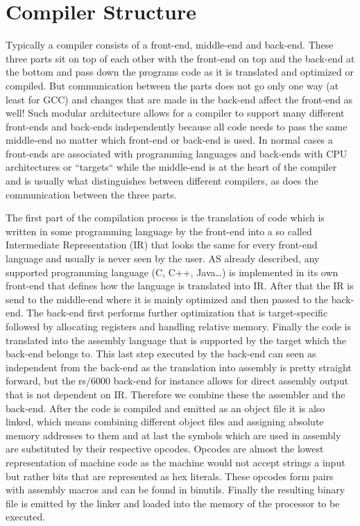 \chapter{Compiler Structure}
\label{chapter:compiler structure}
Typically a compiler consists of a front-end, middle-end and back-end. These three parts sit on top of each other with the front-end on top and the back-end at the bottom and pass down the programs code as it is translated and optimized or compiled. But communication between the parts does not go only one way (at least for GCC)
and changes that are made in the back-end affect the front-end as well!
Such modular architecture  allows for a compiler to support many different front-ends and back-ends independently because all code needs to pass the same middle-end no matter which front-end or back-end is used. In normal cases a front-ends are associated with programming languages and back-ends with CPU architectures or ``targets`` while the middle-end is at the heart of the compiler and is usually what distinguishes between different compilers, as does the communication between the three parts.

The first part of the compilation process is the translation of code which is written in some programming language by the front-end into a so called Intermediate Representation (IR) that looks the same for every front-end language and usually is never seen by the user. AS already described, any supported programming language (C, C++, Java…) is implemented in its own front-end that defines how the language is translated into IR. After that the IR is send to the middle-end where it is mainly optimized and then passed to the back-end. The back-end first performs further optimization that is target-specific followed by allocating registers and handling relative memory. Finally the code is translated into the assembly language that is supported by the target which the back-end belongs to.
This last step executed by the back-end can seen as independent from the back-end as the translation into assembly is pretty straight forward, but the rs/6000 back-end for instance allows for direct assembly output that is not dependent on IR. Therefore we combine these the assembler and the back-end.
After the code is compiled and emitted as an object file it is also linked, which means combining different object files and assigning absolute memory addresses to them and at last the symbols which are used in assembly are substituted by their respective opcodes. Opcodes are almost the lowest representation of machine code as the machine would not accept strings a input but rather bits that are represented as hex literals. These opcodes form pairs with assembly macros and can be found in binutils. Finally the resulting binary file is emitted by the linker and loaded into the memory of the processor to be executed.


